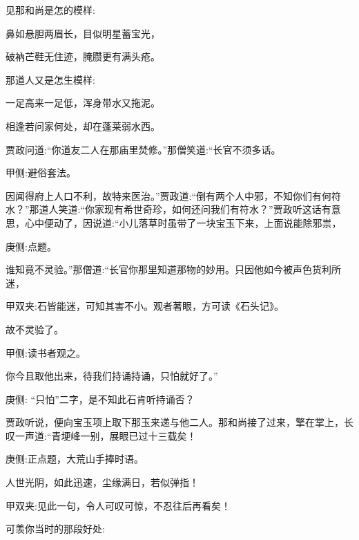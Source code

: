 \begin{parag}
    见那和尚是怎的模样:
\end{parag}


\begin{poem}
    \begin{pl}鼻如悬胆两眉长，目似明星蓄宝光，\end{pl}

    \begin{pl}破衲芒鞋无住迹，腌臜更有满头疮。\end{pl}
\end{poem}


\begin{parag}
    那道人又是怎生模样:
\end{parag}


\begin{poem}
    \begin{pl}一足高来一足低，浑身带水又拖泥。\end{pl}

    \begin{pl}相逢若问家何处，却在蓬莱弱水西。\end{pl}
\end{poem}


\begin{parag}
    贾政问道:“你道友二人在那庙里焚修。”那僧笑道:“长官不须多话。\begin{note}甲侧:避俗套法。\end{note}因闻得府上人口不利，故特来医治。”贾政道:“倒有两个人中邪，不知你们有何符水？”那道人笑道:“你家现有希世奇珍，如何还问我们有符水？”贾政听这话有意思，心中便动了，因说道:“小儿落草时虽带了一块宝玉下来，上面说能除邪祟，\begin{note}庚侧:点题。\end{note}谁知竟不灵验。”那僧道:“长官你那里知道那物的妙用。只因他如今被声色货利所迷，\begin{note}甲双夹:石皆能迷，可知其害不小。观者著眼，方可读《石头记》。\end{note}故不灵验了。\begin{note}甲侧:读书者观之。\end{note}你今且取他出来，待我们持诵持诵，只怕就好了。”\begin{note}庚侧: “只怕”二字，是不知此石肯听持诵否？\end{note}
\end{parag}


\begin{parag}
    贾政听说，便向宝玉项上取下那玉来递与他二人。那和尚接了过来，擎在掌上，长叹一声道:“青埂峰一别，展眼已过十三载矣！\begin{note}庚侧:正点题，大荒山手捧时语。\end{note}人世光阴，如此迅速，尘缘满日，若似弹指！\begin{note}甲双夹:见此一句，令人可叹可惊，不忍往后再看矣！\end{note}可羡你当时的那段好处:
\end{parag}


